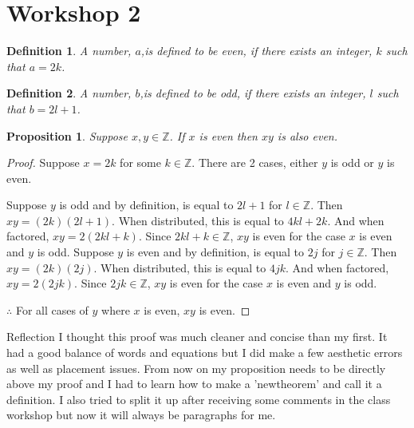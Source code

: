 \documentclass{article}
\newtheorem{prop}{Proposition}
\newtheorem{definition}{Definition}
\begin{document}
\section{Workshop 2}


\begin{definition}
A number, $a$,is defined to be even, if there exists an integer, $k$ such that $a=2k$.
\end{definition}

\begin{definition}
A number, $b$,is defined to be odd, if there exists an integer, $l$ such that $b=2l+1$.
\end{definition}

\begin{prop}
Suppose $x,y \in \mathbb{Z}$. If $x$ is even then $xy$ is also even. 
\end{prop}

\begin{proof}
Suppose $x=2k$ for some $k\in \mathbb{Z}$. There are 2 cases, either $y$ is odd or $y$ is even.

\vspace{5mm}

Suppose $y$ is odd and by definition, is equal to $2l+1$ for $l\in\mathbb{Z}$. Then $xy=(2k)(2l+1)$. When distributed, this is equal to $4kl+2k$. And when factored, $xy=2(2kl+k)$. Since $2kl+k\in\mathbb{Z}$, $xy$ is even for the case $x$ is even and $y$ is odd. Suppose $y$ is even and by definition, is equal to $2j$ for $j\in\mathbb{Z}$. Then $xy=(2k)(2j)$. When distributed, this is equal to $4jk$. And when factored, $xy=2(2jk)$. Since $2jk\in\mathbb{Z}$, $xy$ is even for the case $x$ is even and $y$ is odd.

\vspace{5mm}

$\therefore$ For all cases of $y$ where $x$ is even, $xy$ is even.
\end{proof}

\begin{subsection}{Reflection}
I thought this proof was much cleaner and concise than my first. It had a good balance of words and equations but I did make a few aesthetic errors as well as placement issues. From now on my proposition needs to be directly above my proof and I had to learn how to make a 'newtheorem' and call it a definition. I also tried to split it up after receiving some comments in the class workshop but now it will always be paragraphs for me. 
\end{subsection}
\end{document}
